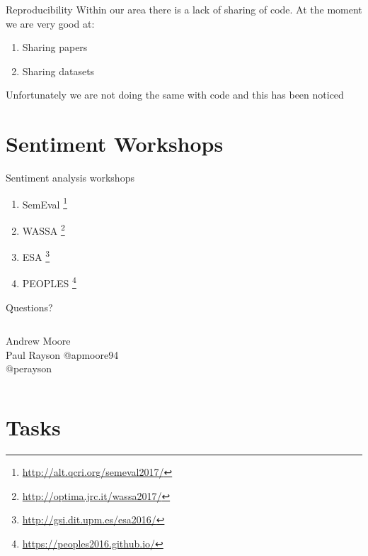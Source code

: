 \documentclass[10pt]{beamer}
\begin{document}
\begin{frame}{Reproducibility}
Within our area there is a lack of sharing of code. At the moment we are very good at:
\begin{enumerate}
\item Sharing papers
\item Sharing datasets
\end{enumerate}

Unfortunately we are not doing the same with code and this has been noticed \cite{Edison17} 
\end{frame}

\section{Sentiment Workshops}

\begin{frame}{Sentiment analysis workshops}
  \begin{enumerate}
    \item SemEval \footnote{\url{http://alt.qcri.org/semeval2017/}}
    \item WASSA \footnote{\url{http://optima.jrc.it/wassa2017/}}
    \item ESA \footnote{\url{http://gsi.dit.upm.es/esa2016/}}
    \item PEOPLES \footnote{\url{https://peoples2016.github.io/}}
  \end{enumerate}
\end{frame}

\begin{frame}[plain]
\begin{center}
\begin{center}
\huge Questions?
\end{center}
\begin{center}
\begin{columns}[T,onlytextwidth]
\centering
Andrew Moore
\\
Paul Rayson
\centering
@apmoore94
\\
@perayson
\end{columns}
\end{center}
\end{center}
\end{frame}

\section{Tasks}
\end{document}
